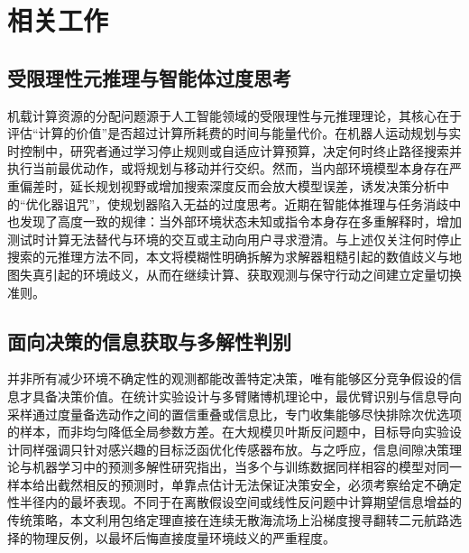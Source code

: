 \section{相关工作}

\subsection{受限理性元推理与智能体过度思考}
机载计算资源的分配问题源于人工智能领域的受限理性与元推理理论，其核心在于评估“计算的价值”是否超过计算所耗费的时间与能量代价\cite{horvitz1987reasoning,russell1991right}。在机器人运动规划与实时控制中，研究者通过学习停止规则或自适应计算预算，决定何时终止路径搜索并执行当前最优动作，或将规划与移动并行交织\cite{xiao2020thinking,sung2021quit,elboher2023formal,magnino2026metareasoning}。然而，当内部环境模型本身存在严重偏差时，延长规划视野或增加搜索深度反而会放大模型误差，诱发决策分析中的“优化器诅咒”，使规划器陷入无益的过度思考\cite{smith2006curse,jiang2015horizon,cuadron2025overthinking}。近期在智能体推理与任务消歧中也发现了高度一致的规律：当外部环境状态未知或指令本身存在多重解释时，增加测试时计算无法替代与环境的交互或主动向用户寻求澄清\cite{hunt2021formalizing,shen2025thinking,kobalczyk2025active}。与上述仅关注何时停止搜索的元推理方法不同，本文将模糊性明确拆解为求解器粗糙引起的数值歧义与地图失真引起的环境歧义，从而在继续计算、获取观测与保守行动之间建立定量切换准则。

\subsection{面向决策的信息获取与多解性判别}
并非所有减少环境不确定性的观测都能改善特定决策，唯有能够区分竞争假设的信息才具备决策价值\cite{chernoff1959sequential,box1967discrimination}。在统计实验设计与多臂赌博机理论中，最优臂识别与信息导向采样通过度量备选动作之间的置信重叠或信息比，专门收集能够尽快排除次优选项的样本，而非均匀降低全局参数方差\cite{garivier2016optimal,russo2018thompson,russo2018ids}。在大规模贝叶斯反问题中，目标导向实验设计同样强调只针对感兴趣的目标泛函优化传感器布放\cite{attia2018goal}。与之呼应，信息间隙决策理论与机器学习中的预测多解性研究指出，当多个与训练数据同样相容的模型对同一样本给出截然相反的预测时，单靠点估计无法保证决策安全，必须考察给定不确定性半径内的最坏表现\cite{benhaim2006infogap,marx2020predictive}。不同于在离散假设空间或线性反问题中计算期望信息增益的传统策略，本文利用包络定理直接在连续无散海流场上沿梯度搜寻翻转二元航路选择的物理反例，以最坏后悔直接度量环境歧义的严重程度。

